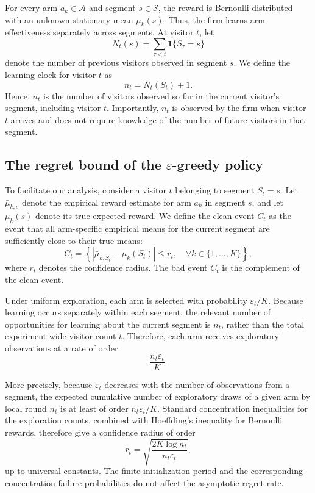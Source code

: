 \documentclass[mksc,nonblindrev]{informs3}
\begin{document}
\begin{APPENDICES}
For every arm $a_k\in\mathcal A$ and segment $s\in\mathcal S$, the reward is Bernoulli distributed with an unknown stationary mean $\mu_k(s)$. Thus, the firm learns arm effectiveness separately across segments. At visitor $t$, let
\begin{equation}
N_t(s)
=
\sum_{\tau<t}\mathbf{1}\{S_\tau=s\}
\end{equation}
denote the number of previous visitors observed in segment $s$. We define the learning clock for visitor $t$ as
\begin{equation}
\label{eq:segment-clock}
n_t
=
N_t(S_t)+1.
\end{equation}
Hence, $n_t$ is the number of visitors observed so far in the current visitor's segment, including visitor $t$. Importantly, $n_t$ is observed by the firm when visitor $t$ arrives and does not require knowledge of the number of future visitors in that segment.

\subsection{The regret bound of the $\varepsilon$-greedy policy}
To facilitate our analysis, consider a visitor $t$ belonging to segment $S_t=s$. Let $\bar{\mu}_{k,s}$ denote the empirical reward estimate for arm $a_k$ in segment $s$, and let $\mu_k(s)$ denote its true expected reward. We define the clean event $C_t$ as the event that all arm-specific empirical means for the current segment are sufficiently close to their true means:
\begin{equation}
\label{eq:clean-event}
C_t
=
\left\{
\left|
\bar{\mu}_{k,S_t}
-
\mu_k(S_t)
\right|
\leq r_t,
\quad
\forall k\in\{1,\ldots,K\}
\right\},
\end{equation}
where $r_t$ denotes the confidence radius. The bad event $\bar C_t$ is the complement of the clean event.

Under uniform exploration, each arm is selected with probability $\varepsilon_t/K$. Because learning occurs separately within each segment, the relevant number of opportunities for learning about the current segment is $n_t$, rather than the total experiment-wide visitor count $t$. Therefore, each arm receives exploratory observations at a rate of order
\begin{equation}
\frac{n_t\varepsilon_t}{K}.
\end{equation}

More precisely, because $\varepsilon_t$ decreases with the number of observations from a segment, the expected cumulative number of exploratory draws of a given arm by local round $n_t$ is at least of order $n_t\varepsilon_t/K$. Standard concentration inequalities for the exploration counts, combined with Hoeffding's inequality for Bernoulli rewards, therefore give a confidence radius of order
\begin{equation}
\label{eq:confidence-radius}
r_t
=
\sqrt{
\frac{2K\log n_t}
{n_t\varepsilon_t}
},
\end{equation}
up to universal constants. The finite initialization period and the corresponding concentration failure probabilities do not affect the asymptotic regret rate.


\end{APPENDICES}
\end{document}
